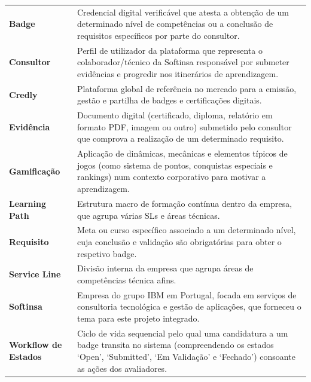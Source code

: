 \documentclass[12pt,a4paper]{report}
\begin{document}
\begin{tabularx}{\textwidth}{@{}l@{\hspace{1em}}X@{}}
  \textbf{\color{secondary}Badge}                & Credencial digital verificável que atesta a obtenção de um determinado nível de competências ou a conclusão de requisitos específicos por parte do consultor. \\[6pt]
  \textbf{\color{secondary}Consultor}             & Perfil de utilizador da plataforma que representa o colaborador/técnico da Softinsa responsável por submeter evidências e progredir nos itinerários de aprendizagem. \\[6pt]
  \textbf{\color{secondary}Credly}                & Plataforma global de referência no mercado para a emissão, gestão e partilha de badges e certificações digitais. \\[6pt]
  \textbf{\color{secondary}Evidência}             & Documento digital (certificado, diploma, relatório em formato PDF, imagem ou outro) submetido pelo consultor que comprova a realização de um determinado requisito. \\[6pt]
  \textbf{\color{secondary}Gamificação}           & Aplicação de dinâmicas, mecânicas e elementos típicos de jogos (como sistema de pontos, conquistas especiais e rankings) num contexto corporativo para motivar a aprendizagem. \\[6pt]
  \textbf{\color{secondary}Learning Path}         & Estrutura macro de formação contínua dentro da empresa, que agrupa várias SLs e áreas técnicas. \\[6pt]
  \textbf{\color{secondary}Requisito}             & Meta ou curso específico associado a um determinado nível, cuja conclusão e validação são obrigatórias para obter o respetivo badge. \\[6pt]
  \textbf{\color{secondary}Service Line}          & Divisão interna da empresa que agrupa áreas de competências técnica afins. \\[6pt]
  \textbf{\color{secondary}Softinsa}              & Empresa do grupo IBM em Portugal, focada em serviços de consultoria tecnológica e gestão de aplicações, que forneceu o tema para este projeto integrado. \\[6pt]
  \textbf{\color{secondary}Workflow de Estados}   & Ciclo de vida sequencial pelo qual uma candidatura a um badge transita no sistema (compreendendo os estados `Open', `Submitted', `Em Validação' e `Fechado') consoante as ações dos avaliadores. \\
\end{tabularx}
\end{document}
